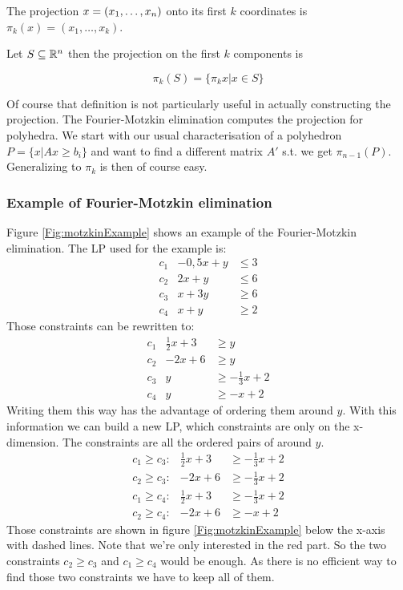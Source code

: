 \begin{Def} The projection $x=({x}_1,\ldots,{x}_{n})$ onto its first $k$ coordinates is $\pi_k(x) = (x_1,\ldots, x_k)$. 

Let $S\subseteq \mathbb{R}^n$ then the projection on the first $k$ components is

\[\pi_k(S)=\{\pi_k{x}|x\in S\}\]
\end{Def}

Of course that definition is not particularly useful in actually constructing the projection. The Fourier-Motzkin elimination computes the projection for polyhedra. We start with our usual characterisation of a polyhedron $P=\{x|Ax\geq b_i\}$ and want to find a different matrix $A'$ s.t. we get $\pi_{n-1}(P)$. Generalizing to $\pi_k$ is then of course easy.

\subsubsection*{Example of Fourier-Motzkin elimination}
Figure \ref{Fig:motzkinExample} shows an example of the Fourier-Motzkin elimination. The LP used for the example is:
\begin{eqnarray*}
c_1 & -0,5x + y & \leq 3 \\
c_2 & 2x + y & \leq 6 \\
c_3 & x+3y & \geq 6 \\
c_4 & x+y & \geq 2
\end{eqnarray*}
Those constraints can be rewritten to:
\begin{eqnarray*}
c_1 & \frac{1}{2}x + 3  & \geq y \\
c_2 & -2x+6 & \geq y \\
c_3 & y & \geq -\frac{1}{3}x+2 \\
c_4 & y & \geq -x+2
\end{eqnarray*}
Writing them this way has the advantage of ordering them around $y$. With this information we can build a new LP, which constraints are only on the x-dimension. The constraints are all the ordered pairs of around $y$.
\begin{eqnarray*}
c_1 \geq c_3: & \frac{1}{2}x + 3 & \geq -\frac{1}{3}x+2  \\
c_2 \geq c_3: & -2x+6 &  \geq -\frac{1}{3}x+2 \\
c_1 \geq c_4: & \frac{1}{2}x + 3   & \geq -\frac{1}{3}x+2 \\
c_2 \geq c_4: & -2x+6 & \geq -x+2
\end{eqnarray*}
Those constraints are shown in figure \ref{Fig:motzkinExample} below the x-axis with dashed lines. Note that we're only interested in the red part. So the two constraints $c_2 \geq c_3$ and $c_1 \geq c_4$ would be enough. As there is no efficient way to find those two constraints we have to keep all of them. 

